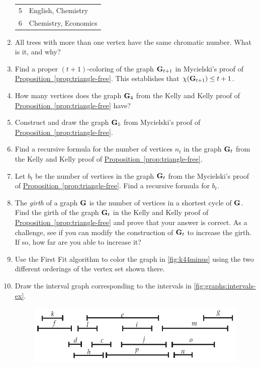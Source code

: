 \begin{enumerate}
\begin{center}
\begin{tabular}{c|l}
      5 & English, Chemistry\\
      6 & Chemistry, Economics
    \end{tabular}
  \end{center}
\item All trees with more than one vertex have the same chromatic
  number. What is it, and why?
\item \label{ex:color} Find a proper $(t+1)$-coloring of the
  graph $\mathbf{G}_{t+1}$ in Mycielski's proof of
  \hyperref[prop:triangle-free]{Proposition~\ref*{prop:triangle-free}}. This
  establishes that $\chi(\mathbf{G}_{t+1})\leq t+1$.
\item How many vertices does the graph $\mathbf{G}_4$ from the Kelly and
  Kelly proof of
  \hyperref[prop:triangle-free]{Proposition~\ref*{prop:triangle-free}}
  have?
\item Construct and draw the graph $\mathbf{G}_5$ from Mycielski's proof of
  \hyperref[prop:triangle-free]{Proposition~\ref*{prop:triangle-free}}.
\item Find a recursive formula for the number of vertices $n_t$ in the
  graph $\mathbf{G}_t$ from the Kelly and Kelly proof of
  \hyperref[prop:triangle-free]{Proposition~\ref*{prop:triangle-free}}.
\item Let $b_t$ be the number of vertices in the graph $\mathbf{G}_t$ from
  the Mycielski's proof of
  \hyperref[prop:triangle-free]{Proposition~\ref*{prop:triangle-free}}. Find
  a recursive formula for $b_t$.
\item The \emph{girth} of a graph $\mathbf{G}$ is the number of vertices in
  a shortest cycle of $\mathbf{G}$. Find the girth of the graph $\mathbf{G}_t$ in
  the Kelly and Kelly proof of
  \hyperref[prop:triangle-free]{Proposition~\ref*{prop:triangle-free}}
  and prove that your answer is correct. As a challenge, see if you
  can modify the construction of $\mathbf{G}_t$ to increase the girth. If
  so, how far are you able to increase it?
\item \label{ex:graphs:first-fit-color}Use the First Fit algorithm to
  color the graph in \autoref{fig:k44minus} using the two different
  orderings of the vertex set shown there.
\item Draw the interval graph corresponding to the intervals in
  \autoref{fig:graphs:intervals-ex}.
  \begin{figure}[h]
    \centering
    \includegraphics{graphs-figs/firstfit-intgraph}

\end{figure}
\end{enumerate}
